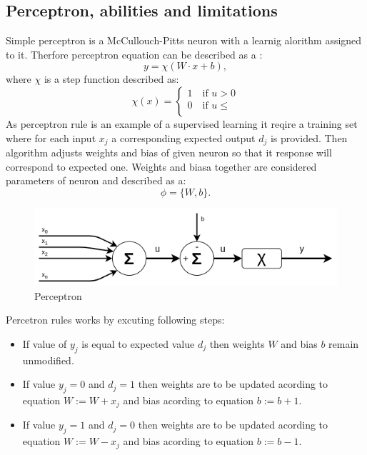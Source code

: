 \subsection{Perceptron, abilities and limitations}
Simple perceptron is a McCullouch-Pitts neuron with a learnig alorithm assigned to it.
Therfore perceptron equation can be described as a :
\begin{equation}
	y = \chi (W\cdot x+b),
\end{equation}
where $\chi$ is a step function described as:
\begin{equation}
	\chi (x) =  
	\begin{cases}
		1        \quad \text{if } u > 0\\
		0        \quad \text{if } u \leq \\
	\end{cases}
\end{equation}
As perceptron rule is an example of a supervised learning it reqire a training set where for 
each input $x_{j}$ a corresponding expected output $d_{j}$ is provided. 
Then algorithm adjusts weights and bias of given neuron so that it response will 
correspond to expected one. 
Weights and biasa together are considered parameters of neuron and described as a:
\begin{equation}
	\phi = \{ W,b \}.
\end{equation}
\begin{figure}[ht] 
	\centering
	\includegraphics[width=\textwidth]{res/perceptron}
	\caption{Perceptron}
	\label{fig:perceptron}
\end{figure}
Percetron rules works by excuting following steps:
\begin{itemize}
	\item If value of $y_{j}$ is equal to expected value $d_{j}$ then weights $W$ and 
		  bias $b$ remain unmodified.
	\item If value $y_{j}=0$ and $d_{j}=1$ then weights are to be updated acording to 
		  equation $W:=W+x_{j}$ and bias acording to equation $b:=b+1$.
	\item If value $y_{j}=1$ and $d_{j}=0$ then weights are to be updated acording to 
		  equation $W:=W-x_{j}$ and bias acording to equation $b:=b-1$.
\end{itemize}
